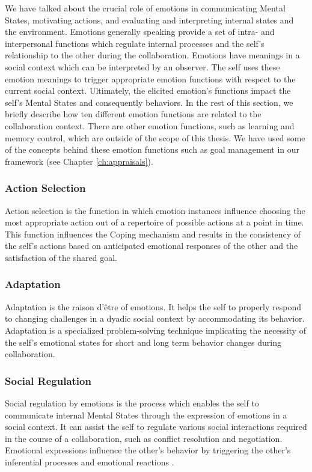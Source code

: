 \documentclass[12pt]{report}
\begin{document}
We have talked about the crucial role of emotions in communicating Mental
States, motivating actions, and evaluating and interpreting internal states and
the environment. Emotions generally speaking provide a set of intra- and
interpersonal functions which regulate internal processes and the self's
relationship to the other during the collaboration. Emotions have meanings in a
social context which can be interpreted by an observer. The self uses these
emotion meanings to trigger appropriate emotion functions with respect to the
current social context. Ultimately, the elicited emotion's functions impact the
self's Mental States and consequently behaviors. In the rest of this section, we
briefly describe how ten different emotion functions are related to the
collaboration context. There are other emotion functions, such as learning and
memory control, which are outside of the scope of this thesis. We have used some
of the concepts behind these emotion functions such as goal management in our
framework (see Chapter \ref{ch:appraisals}).

\subsubsection{Action Selection} Action selection is the function in which
emotion instances influence choosing the most appropriate action out of a repertoire of
possible actions at a point in time. This function influences the Coping
mechanism and results in the consistency of the self's actions based on
anticipated emotional responses of the other and the satisfaction of the shared
goal.

\subsubsection{Adaptation} Adaptation is the raison d'\^{e}tre of emotions. It
helps the self to properly respond to changing challenges in a dyadic social
context by accommodating its behavior. Adaptation is a specialized
problem-solving technique implicating the necessity of the self's emotional
states for short and long term behavior changes during collaboration.

\subsubsection{Social Regulation} Social regulation by emotions is the process
which enables the self to communicate internal Mental States through the
expression of emotions in a social context. It can assist the self to regulate
various social interactions required in the course of a collaboration, such as
conflict resolution and negotiation. Emotional expressions influence the other's
behavior by triggering the other's inferential processes and emotional reactions
\cite{kleef:emotion-regulate-social}.
\end{document}
